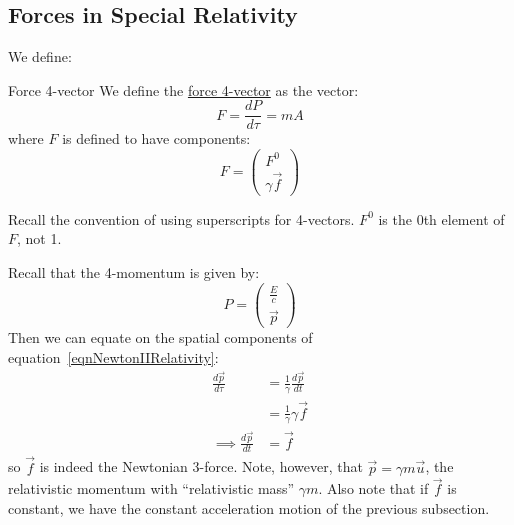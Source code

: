 \documentclass[../Main.tex]{subfiles}
\begin{document}
\subsection{Forces in Special Relativity}
We define:
\begin{definition}{Force 4-vector}
    We define the \underline{force 4-vector} as the vector:
    \begin{equation}
        F = \frac{dP}{d\tau} = mA
        \label{eqnNewtonIIRelativity}
    \end{equation}
    where $F$ is defined to have components:
    \begin{equation*}
        F = \begin{pmatrix}F^0 \\ \gamma\vec{f}\end{pmatrix}
    \end{equation*}
\end{definition}
\begin{remark}
    Recall the convention of using superscripts for 4-vectors. $F^0$ is the $0$th element of $F$, not 1.
\end{remark}
Recall that the 4-momentum is given by:
\begin{equation*}
    P = \begin{pmatrix}\frac{E}{c} \\ \vec{p}\end{pmatrix}
\end{equation*}
Then we can equate on the spatial components of equation~\ref{eqnNewtonIIRelativity}:
\begin{align*}
    \frac{d\vec{p}}{d\tau} &= \frac{1}{\gamma} \frac{d\vec{p}}{dt} \\
    &= \frac{1}{\gamma} \gamma \vec{f} \\
    \implies \frac{d\vec{p}}{dt} &= \vec{f}
\end{align*}
so $\vec{f}$ is indeed the Newtonian 3-force. Note, however, that $\vec{p} = \gamma m \vec{u}$, the relativistic momentum with ``relativistic mass'' $\gamma m$. Also note that if $\vec{f}$ is constant, we have the constant acceleration motion of the previous subsection.
\end{document}
